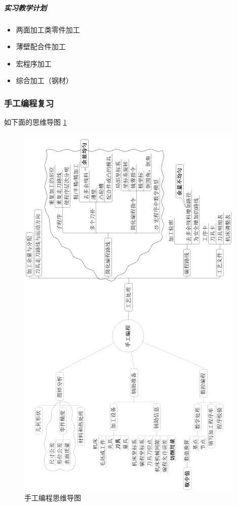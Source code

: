 \subparagraph{实习教学计划}
\begin{itemize}
	\item 两面加工类零件加工

	\item 薄壁配合件加工

	\item 宏程序加工

	\item 综合加工（钢材）
\end{itemize}

\subsubsection{手工编程复习} 
如下面的思维导图 \ref{手工编程思维导图}
\begin{figure}	
	\includegraphics{images/图片1} 
	\caption{手工编程思维导图}\label{手工编程思维导图}
\end{figure}

